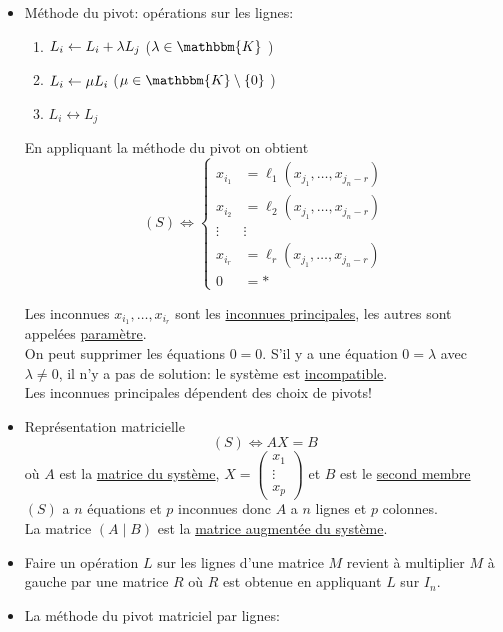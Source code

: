 \begin{rmk}
	[Résumé]
	\begin{itemize}
		\item Méthode du pivot: opérations sur les lignes:
			\begin{enumerate}
				\item $L_i \leftarrow L_i + \lambda L_j$ ($\lambda \in \mathbbm{K}$ )
				\item $L_i \leftarrow \mu L_i$ ($\mu \in \mathbbm{K}\setminus \{0\}$ )
				\item $L_i \leftrightarrow L_j$
			\end{enumerate}

			En appliquant la méthode du pivot on obtient
			\[
				(S) \iff \begin{cases}
					x_{i_1} &= \ell_1(x_{j_1},\ldots,x_{j_n-r})\\
					x_{i_2} &= \ell_2(x_{j_1},\ldots,x_{j_n-r})\\
					\vdots & \vdots\\
					x_{i_r} &= \ell_r(x_{j_1},\ldots,x_{j_n-r})\\
					0 &= *
				\end{cases}
			\]

			Les inconnues $x_{i_1}, \ldots, x_{i_r}$ sont les \underline{inconnues principales}, les autres sont appelées \underline{paramètre}.\\
			On peut supprimer les équations $0 = 0$. S'il y a une équation $0 = \lambda$ avec $\lambda \neq 0$, il n'y a pas de solution: le système est \underline{incompatible}.\\
			Les inconnues principales dépendent des choix de pivots!
		\item Représentation matricielle
			\[
				(S) \iff AX = B
			\] où $A$ est la \underline{matrice du système}, $X = \begin{pmatrix} x_1\\ \vdots\\ x_p \end{pmatrix}$ et $B$ est le \underline{second membre}\\
			$(S)$ a $n$ équations et $p$ inconnues donc $A$ a $n$ lignes et $p$ colonnes.\\
			La matrice $(A\mid B)$ est la \underline{matrice augmentée du système}.
		\item Faire un opération $L$ sur les lignes d'une matrice $M$ revient à multiplier $M$ à gauche par une matrice $R$ où $R$ est obtenue en appliquant $L$ sur $I_n$.
		\item La méthode du pivot matriciel par lignes:
			\[
			\]
	\end{itemize}
\end{rmk}

